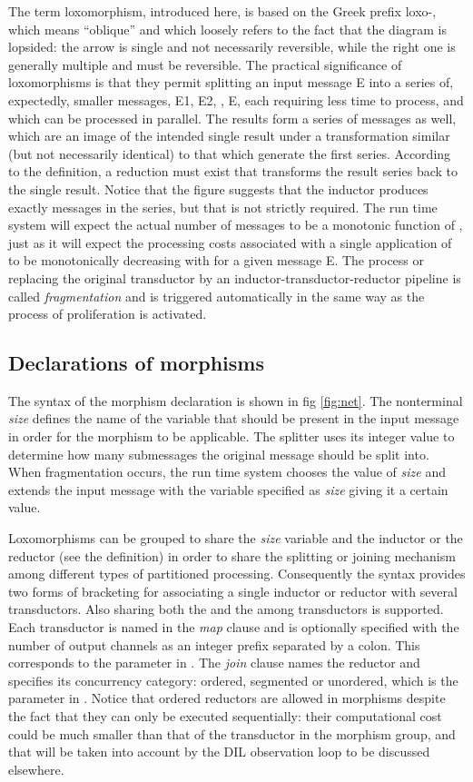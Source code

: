 \documentclass[11pt]{report}
\begin{document}
The term loxomorphism, introduced here, is based on the Greek prefix loxo-, which means ``oblique'' and
which loosely refers to the fact that the diagram is lopsided:
the arrow  is single and not necessarily reversible,
while the right one  is generally multiple and must be reversible.
The practical significance of loxomorphisms is that they permit splitting an input message E into a series of, expectedly, smaller messages, E1, E2, , E, 
each requiring less time
to process, and which can be processed in parallel. The results form a series of messages as well, which are an image of the
intended single result under a transformation similar (but not necessarily identical)  to that which generate the first series. According to the definition, a reduction
must exist that transforms the result series back to the single result. Notice that the figure suggests that the inductor  produces exactly  messages
in the series, but that is not strictly required. The run time system will expect the actual number of messages to be a monotonic function of , just as it will expect
the processing costs associated with a single application of  to be monotonically decreasing with  for a given message E. The process or replacing
the original transductor by an inductor-transductor-reductor pipeline is called {\em fragmentation} and is triggered automatically in the same way as the
process of proliferation is activated. 

\subsection{Declarations of morphisms}

The syntax of the morphism declaration is shown in fig \ref{fig:net}. The nonterminal {\it size} defines the name of the variable that should be present
in the input message in order for the morphism to be applicable. The splitter uses its integer value to determine how many submessages the original message
should be split into. When fragmentation occurs, the run time system chooses the value of {\it size} and extends the input message with the variable specified 
as {\em size} giving it a certain value.   

Loxomorphisms can be grouped to share the {\em size} variable and the inductor  or  the reductor  (see the definition) in order to share the splitting or joining mechanism among different types of partitioned processing. Consequently the syntax provides two forms of bracketing for associating a single inductor or 
reductor with several transductors. Also sharing both the  and the  among transductors is supported. Each transductor is named in the {\it map} clause
and is optionally specified with the number of output channels as an integer prefix separated by a colon. This corresponds to the  parameter 
in . 
The {\em join} clause names the reductor and specifies
its concurrency category: ordered, segmented or unordered, which is the  parameter in . 
Notice that ordered reductors are allowed in morphisms despite the fact that they can only be executed
sequentially: their computational cost could be much smaller than that of the transductor in the morphism group, and that will be taken into account by the DIL
observation loop to be discussed elsewhere. 
\end{document}
